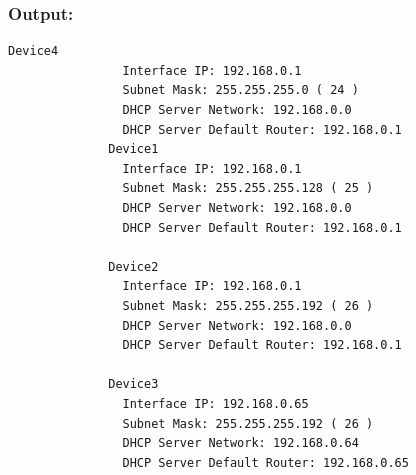 \subsubsection{Output:}

\begin{lstlisting}[style=pythonStyle, caption={Output.}, backgroundcolor=\color{codebackground}]
              Device4
                Interface IP: 192.168.0.1
                Subnet Mask: 255.255.255.0 ( 24 )       
                DHCP Server Network: 192.168.0.0        
                DHCP Server Default Router: 192.168.0.1
              Device1
                Interface IP: 192.168.0.1
                Subnet Mask: 255.255.255.128 ( 25 )     
                DHCP Server Network: 192.168.0.0        
                DHCP Server Default Router: 192.168.0.1 

              Device2
                Interface IP: 192.168.0.1
                Subnet Mask: 255.255.255.192 ( 26 )     
                DHCP Server Network: 192.168.0.0        
                DHCP Server Default Router: 192.168.0.1 

              Device3
                Interface IP: 192.168.0.65
                Subnet Mask: 255.255.255.192 ( 26 )     
                DHCP Server Network: 192.168.0.64       
                DHCP Server Default Router: 192.168.0.65

\end{lstlisting}